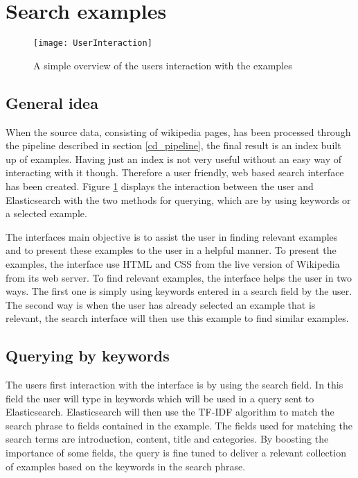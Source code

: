 \section{Search examples}
\begin{figure}[h]
\caption{A simple overview of the users interaction with the examples}
\texttt{[image: UserInteraction]}
\label{fig:ui}
\end{figure}

\subsection{General idea}
When the source data, consisting of wikipedia pages, has been processed through the pipeline described in section \ref{cd_pipeline}, the final result is an index built up of examples. Having just an index is not very useful without an easy way of interacting with it though. Therefore a user friendly, web based search interface has been created. Figure \ref{fig:ui} displays the interaction between the user and Elasticsearch with the two methods for querying, which are by using keywords or a selected example.

The interfaces main objective is to assist the user in finding relevant examples and to present these examples to the user in a helpful manner. To present the examples, the interface use HTML and CSS from the live version of Wikipedia from its web server. To find relevant examples, the interface helps the user in two ways. The first one is simply using keywords entered in a search field by the user. The second way is when the user has already selected an example that is relevant, the search interface will then use this example to find similar examples.

\subsection{Querying by keywords}

The users first interaction with the interface is by using the search field. In this field the user will type in keywords which will be used in a query sent to Elasticsearch. Elasticsearch will then use the TF-IDF algorithm to match the search phrase to fields contained in the example. The fields used for matching the search terms are introduction, content, title and categories. By boosting the importance of some fields, the query is fine tuned to deliver a relevant collection of examples based on the keywords in the search phrase.


